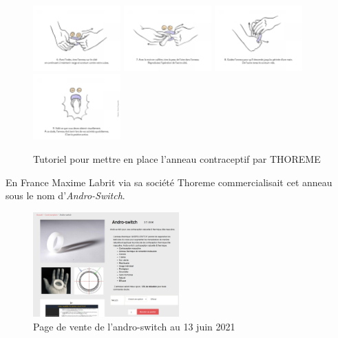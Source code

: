 \documentclass[12pt,a4paper]{report}
\begin{document}
\begin{figure}[h]
    \includegraphics[width=0.3\textwidth]{images/scientiphique/Tuto_andro_switch/6.png}
    \includegraphics[width=0.3\textwidth]{images/scientiphique/Tuto_andro_switch/7.png}
    \includegraphics[width=0.3\textwidth]{images/scientiphique/Tuto_andro_switch/8.png}
    \includegraphics[width=0.3\textwidth]{images/scientiphique/Tuto_andro_switch/9.png}
    \caption{Tutoriel pour mettre en place l'anneau contraceptif par THOREME}
    \label{fig:tuto_andro_switch}
\end{figure}

En France Maxime Labrit via sa société Thoreme commercialisait cet anneau sous le nom d'\textit{Andro-Switch}. \cite{guillaumedaudinContraceptesEnqueteDernier2022}

\begin{figure}[H]
    \centering
    \includegraphics[width=0.5\textwidth]{images/scientiphique/vente_andro_switch.png}
    \caption{Page de vente de l'andro-switch au 13 juin 2021}
    \label{fig:vente_andro_switch}
\end{figure}
\end{document}
